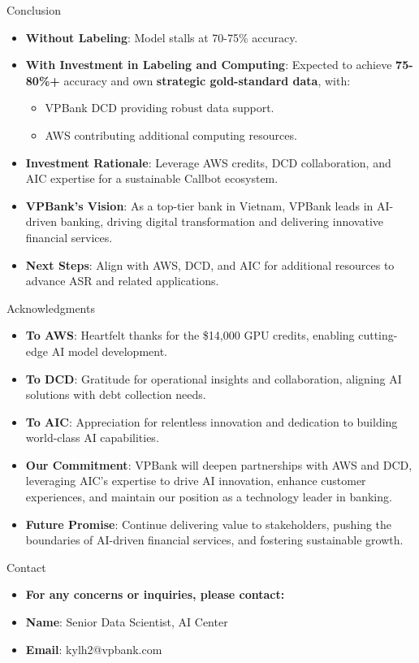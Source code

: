 \documentclass{beamer}
\begin{document}
\begin{frame}{Conclusion}
    \begin{itemize}
        \item \textbf{Without Labeling}: Model stalls at 70-75\% accuracy.
        \item \textbf{With Investment in Labeling and Computing}: Expected to achieve \textbf{75-80\%+} accuracy and own \textbf{strategic gold-standard data}, with:
            \begin{itemize}
                \item VPBank DCD providing robust data support.
                \item AWS contributing additional computing resources.
            \end{itemize}
        \item \textbf{Investment Rationale}: Leverage AWS credits, DCD collaboration, and AIC expertise for a sustainable Callbot ecosystem.
        \item \textbf{VPBank’s Vision}: As a top-tier bank in Vietnam, VPBank leads in AI-driven banking, driving digital transformation and delivering innovative financial services.
        \item \textbf{Next Steps}: Align with AWS, DCD, and AIC for additional resources to advance ASR and related applications.
    \end{itemize}
\end{frame}

\begin{frame}{Acknowledgments}
    \begin{itemize}
        \item \textbf{To AWS}: Heartfelt thanks for the \$14,000 GPU credits, enabling cutting-edge AI model development.
        \item \textbf{To DCD}: Gratitude for operational insights and collaboration, aligning AI solutions with debt collection needs.
        \item \textbf{To AIC}: Appreciation for relentless innovation and dedication to building world-class AI capabilities.
        \item \textbf{Our Commitment}: VPBank will deepen partnerships with AWS and DCD, leveraging AIC’s expertise to drive AI innovation, enhance customer experiences, and maintain our position as a technology leader in banking.
        \item \textbf{Future Promise}: Continue delivering value to stakeholders, pushing the boundaries of AI-driven financial services, and fostering sustainable growth.
    \end{itemize}
\end{frame}

\begin{frame}{Contact}
    \begin{itemize}
        \item \textbf{For any concerns or inquiries, please contact:}
        \item \textbf{Name}: Senior Data Scientist, AI Center
        \item \textbf{Email}: kylh2@vpbank.com
    \end{itemize}
\end{frame}

\end{document}
